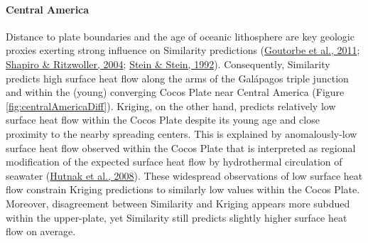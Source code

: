 \hypertarget{central-america}{%
\paragraph{Central America}\label{central-america}}

Distance to plate boundaries and the age of oceanic lithosphere are key geologic proxies exerting strong influence on Similarity predictions (\protect\hyperlink{ref-goutorbe2011}{Goutorbe et al., 2011}; \protect\hyperlink{ref-shapiro2004}{Shapiro \& Ritzwoller, 2004}; \protect\hyperlink{ref-stein1992}{Stein \& Stein, 1992}). Consequently, Similarity predicts high surface heat flow along the arms of the Galápagos triple junction and within the (young) converging Cocos Plate near Central America (Figure \ref{fig:centralAmericaDiff}). Kriging, on the other hand, predicts relatively low surface heat flow within the Cocos Plate despite its young age and close proximity to the nearby spreading centers. This is explained by anomalously-low surface heat flow observed within the Cocos Plate that is interpreted as regional modification of the expected surface heat flow by hydrothermal circulation of seawater (\protect\hyperlink{ref-hutnak2008}{Hutnak et al., 2008}). These widespread observations of low surface heat flow constrain Kriging predictions to similarly low values within the Cocos Plate. Moreover, disagreement between Similarity and Kriging appears more subdued within the upper-plate, yet Similarity still predicts slightly higher surface heat flow on average.



